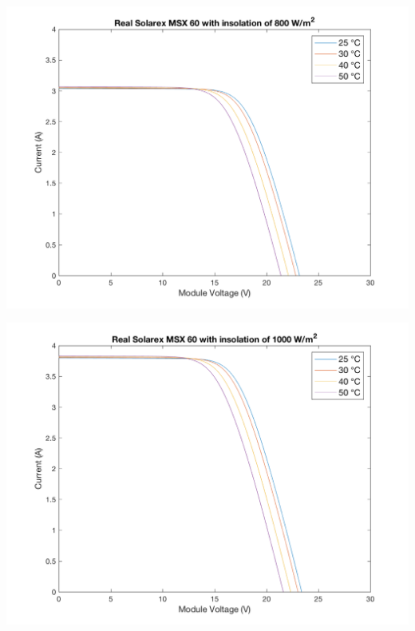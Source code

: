 \documentclass[fleqn]{article}
\begin{document}
\begin{enumerate}
\begin{center}
  \end{center}
  \begin{center}
    \includegraphics[width=0.9\linewidth]{800W-r.png}
  \end{center}
  \begin{center}
    \includegraphics[width=0.9\linewidth]{1000W-r.png}
  \end{center}
  

\end{enumerate}
\end{document}
